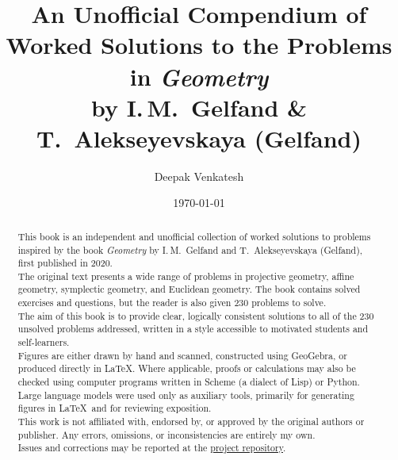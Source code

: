 \documentclass[10pt]{article}
\title{%
    An Unofficial Compendium of Worked Solutions to the Problems in
    \textit{Geometry}\\[0.5em]
    \large
    by I.\,M.~Gelfand \& T.~Alekseyevskaya (Gelfand)
}
\author{Deepak Venkatesh}
\date{\today}
\newcounter{problem}
\begin{document}

\maketitle



\begin{abstract}

\noindent This book is an independent and unofficial collection of worked solutions
to problems inspired by the book \textit{Geometry} by
I.\,M.~Gelfand and T.~Alekseyevskaya (Gelfand), first published in 2020.\\

\noindent The original text presents a wide range of problems in projective geometry,
affine geometry, symplectic geometry, and Euclidean geometry. The book
contains solved exercises and questions, but the reader is also given
230 problems to solve.\\

\noindent The aim of this book is to provide clear, logically consistent solutions
to all of the 230 unsolved problems addressed, written in a style accessible to
motivated students and self-learners.\\

\noindent Figures are either drawn by hand and scanned, constructed using GeoGebra,
or produced directly in \LaTeX. Where applicable, proofs or calculations
may also be checked using computer programs written in Scheme
(a dialect of Lisp) or Python.\\

\noindent Large language models were used only as auxiliary tools, primarily for
generating figures in \LaTeX\ and for reviewing exposition.\\

\noindent This work is not affiliated with, endorsed by, or approved by the original
authors or publisher. Any errors, omissions, or inconsistencies are
entirely my own.\\

\noindent Issues and corrections may be reported at the
\href{https://github.com/deepak-venkatesh/gelfand-geometry/issues}
{project repository}.

\end{abstract}
\end{document}
